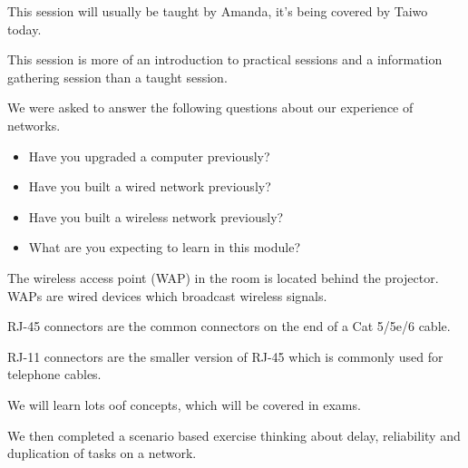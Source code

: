 
This session will usually be taught by Amanda, it's being covered by Taiwo today.

This session is more of an introduction to practical sessions and a information gathering session than a taught session.

We were asked to answer the following questions about our experience of networks.
\begin{itemize}
    \item Have you upgraded a computer previously?
    \item Have you built a wired network previously?
    \item Have you built a wireless network previously?
    \item What are you expecting to learn in this module?
\end{itemize}

The wireless access point (WAP) in the room is located behind the projector. WAPs are wired devices which broadcast wireless signals.

RJ-45 connectors are the common connectors on the end of a Cat 5/5e/6 cable.

RJ-11 connectors are the smaller version of RJ-45 which is commonly used for telephone cables.

We will learn lots oof concepts, which will be covered in exams.

We then completed a scenario based exercise thinking about delay, reliability and duplication of tasks on a network.